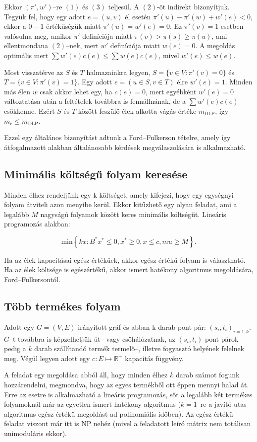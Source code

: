 Ekkor $(\pi',w')$--re $(1)$ és $(3)$ teljesül. A $(2)$-öt indirekt bizonyítjuk.
Tegyük fel, hogy egy adott $e=(u,v)$ él esetén $\pi'(u)-\pi'(w)+w'(e)<0$, ekkor
a $0-1$ értékűségük miatt $\pi'(u)=w'(e)=0$. Ez $\pi'(v)=1$ esetben valósulna
meg, amikor $\pi'$ definíciója miatt $\pi(v) > \pi(s) \geq \pi(u)$, ami
ellentmondana $(2)$--nek, mert $w'$ definíciója miatt $w(e)=0$. A megoldás
optimális mert $\sum w'(e)c(e) \leq \sum w(e)c(e)$, mivel $w'(e) \leq w(e)$.

Most visszatérve az $S$ és $T$ halmazainkra legyen, $S=\{v \in V: \pi'(v)=0\} $
és $T=\{v \in V: \pi'(v)=1\}$. Egy adott $e=(u \in S, v \in T)$ élre $w'(e)=1$.
Minden más élen $w$ csak akkor lehet egy, ha $c(e)=0$, mert egyébként $w'(e)=0$
változtatása után a feltételek továbbra is fennállnának, de a $\sum w'(e)c(e)$
csökkenne. Ezért $S$ és $T$ között feszülő élek alkotta vágás értéke
$m_{\mbox{DLP}}$, így $m_{\mbox{c}} \leq m_{\mbox{DLP}}$.

Ezzel egy általános bizonyítást adtunk a Ford--Fulkerson tételre, amely így
átfogalmazott alakban általánosabb kérdések megválaszolására is alkalmazható.

\subsection{Minimális költségű folyam keresése}

Minden élhez rendeljünk egy k költséget, amely kifejezi, hogy egy egységnyi folyam
átviteli azon menyibe kerül. Ekkor kitűzhető egy olyan feladat, ami a legalább $M$
nagyságú folyamok között keres minimális költségűt. Lineáris programozás alakban:

\[ \mbox{min} \left\{kx: B^*x^* \leq 0, x^* \geq 0, x \leq c,mu \geq M \right\}. \]

Ha az élek kapacitásai egész értékűek, akkor egész értékű folyam is választható.
Ha az élek költsége is egészértékű, akkor ismert hatékony algoritmus megoldására,
Ford--Fulkersontól.

\subsection{Több termékes folyam}

Adott egy $G=(V,E)$ irányított gráf és abban k darab pont pár:
$(s_i,t_i)_{i = \overline{1,k}}$. $G$--t továbbra is képzelhetjük út-- vagy
csőhálózatnak, az $(s_i, t_i)$ pont párok pedig a $k$ darab szállítandó termék
termelő--, illetve fogyasztó helyének felelnek meg. Végül legyen adott egy $c:E
\mapsto \mathbb{R}^+$ kapacitás függvény.

A feladat egy megoldása abból áll, hogy minden élhez $k$ darab számot fogunk
hozzárendelni, megmondva, hogy az egyes termékből ott éppen mennyi halad át.
Erre az esetre is alkalmazható a lineáris programozás, sőt a legalább két
termékes folyamoknál már az egyetlen ismert hatékony algoritmus ($k=1$--re a
javító utas algoritmus egész értékű megoldást ad polinomiális időben). Az egész
értékű feladat viszont már itt is NP nehéz (mivel a feladatott leíró mátrix nem
totálisan unimoduláris ekkor).
